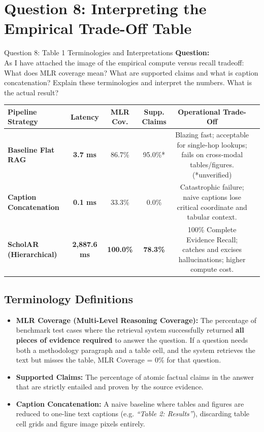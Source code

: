 \documentclass[11pt,a4paper]{article}
\begin{document}
\newpage

\section{Question 8: Interpreting the Empirical Trade-Off Table}

\begin{questionbox}{Question 8: Table 1 Terminologies and Interpretations}
\textbf{Question:}\\
As I have attached the image of the empirical compute versus recall tradeoff: What does MLR coverage mean? What are supported claims and what is caption concatenation? Explain these terminologies and interpret the numbers. What is the actual result?
\end{questionbox}

\begin{center}
\small
\begin{tabular}{@{}lccccp{5.5cm}@{}}
\toprule
\textbf{Pipeline Strategy} & \textbf{Latency} & \textbf{MLR Cov.} & \textbf{Supp. Claims} & \textbf{Operational Trade-Off} \\
\midrule
\textbf{Baseline Flat RAG} & \textbf{3.7 ms} & 86.7\% & 95.0\%* & Blazing fast; acceptable for single-hop lookups; fails on cross-modal tables/figures. (*unverified) \\
\textbf{Caption Concatenation} & \textbf{0.1 ms} & 33.3\% & 0.0\% & Catastrophic failure; naive captions lose critical coordinate and tabular context. \\
\textbf{ScholAR (Hierarchical)} & \textbf{2,887.6 ms} & \textbf{100.0\%} & \textbf{78.3\%} & 100\% Complete Evidence Recall; catches and excises hallucinations; higher compute cost. \\
\bottomrule
\end{tabular}
\end{center}

\subsection{Terminology Definitions}
\begin{itemize}
    \item \textbf{MLR Coverage (Multi-Level Reasoning Coverage):} The percentage of benchmark test cases where the retrieval system successfully returned \textbf{all pieces of evidence required} to answer the question. If a question needs both a methodology paragraph and a table cell, and the system retrieves the text but misses the table, MLR Coverage = 0\% for that question.
    \item \textbf{Supported Claims:} The percentage of atomic factual claims in the answer that are strictly entailed and proven by the source evidence.
    \item \textbf{Caption Concatenation:} A naive baseline where tables and figures are reduced to one-line text captions (e.g. \textit{``Table 2: Results''}), discarding table cell grids and figure image pixels entirely.
\end{itemize}
\end{document}
